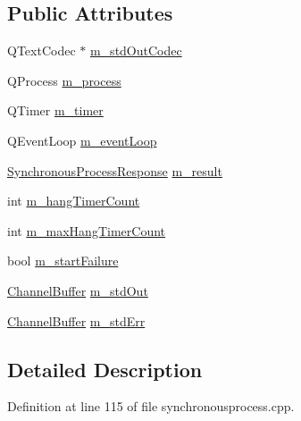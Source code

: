 \subsection*{\-Public \-Attributes}
\begin{DoxyCompactItemize}
\item 
\-Q\-Text\-Codec $\ast$ \hyperlink{struct_utils_1_1_synchronous_process_private_ae309539275cdf8ecf4189526058d2cb6}{m\-\_\-std\-Out\-Codec}
\item 
\-Q\-Process \hyperlink{struct_utils_1_1_synchronous_process_private_a9d038c134196fac6a5f996a3d290ef3a}{m\-\_\-process}
\item 
\-Q\-Timer \hyperlink{struct_utils_1_1_synchronous_process_private_a3fe987ce5909ead1e57e259369e56178}{m\-\_\-timer}
\item 
\-Q\-Event\-Loop \hyperlink{struct_utils_1_1_synchronous_process_private_a6180310bc850d467e6de05bb290cbe4d}{m\-\_\-event\-Loop}
\item 
\hyperlink{struct_utils_1_1_synchronous_process_response}{\-Synchronous\-Process\-Response} \hyperlink{struct_utils_1_1_synchronous_process_private_a608f84c5b1a6612ba627ddbe33fe5a0a}{m\-\_\-result}
\item 
int \hyperlink{struct_utils_1_1_synchronous_process_private_ac7de20b273159cc80d6e65fc726667a9}{m\-\_\-hang\-Timer\-Count}
\item 
int \hyperlink{struct_utils_1_1_synchronous_process_private_a597b1e5e3588256a60e31e098839f985}{m\-\_\-max\-Hang\-Timer\-Count}
\item 
bool \hyperlink{struct_utils_1_1_synchronous_process_private_af0eb23e013827b48bea15ed1ba1365c0}{m\-\_\-start\-Failure}
\item 
\hyperlink{struct_utils_1_1_channel_buffer}{\-Channel\-Buffer} \hyperlink{struct_utils_1_1_synchronous_process_private_a619a54cc495542f58dba37ea569d02df}{m\-\_\-std\-Out}
\item 
\hyperlink{struct_utils_1_1_channel_buffer}{\-Channel\-Buffer} \hyperlink{struct_utils_1_1_synchronous_process_private_a91f0119521a74e8a136b01fee2e6bc2c}{m\-\_\-std\-Err}
\end{DoxyCompactItemize}


\subsection{\-Detailed \-Description}


\-Definition at line 115 of file synchronousprocess.\-cpp.



